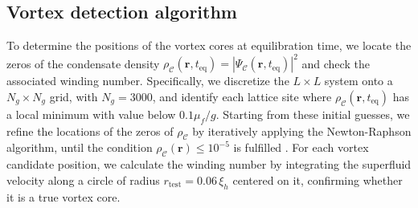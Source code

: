 \documentclass[aps,prl,twocolumn,showpacs,notitlepage,floatfix,superscriptaddress]{revtex4-1}
\begin{document}
\subsection{Vortex detection algorithm}
To determine the positions of the vortex cores at equilibration time, we locate the zeros of the condensate density $\rho_{\mathcal{C}}(\boldsymbol{r},t_{\textrm{eq}})=|\Psi_{\mathcal{C}}(\boldsymbol{r},t_{\textrm{eq}})|^2$ and check the associated winding number.
Specifically, we discretize the $L\times L$ system onto a $N_g \times N_g$ grid, with $N_g = 3000$, and identify each lattice site where
$\rho_\mathcal{C} \left( \boldsymbol{r}, t_{\textrm{eq}} \right)$ has a local minimum with value below $0.1\mu_f / g$. Starting from these initial guesses, we refine the locations of the zeros of $\rho_\mathcal{C}$ by iteratively applying the Newton-Raphson algorithm, until the condition $\rho_\mathcal{C} \left( \boldsymbol{r}\right) \le 10^{-5}$ is fulfilled \cite{Villois_2016}.
For each vortex candidate position, we calculate the winding number by integrating the superfluid velocity along a circle of radius \(r_{\text{test}} = 0.06\,\xi_h\) centered on it, confirming whether it is a true vortex core.
\end{document}
